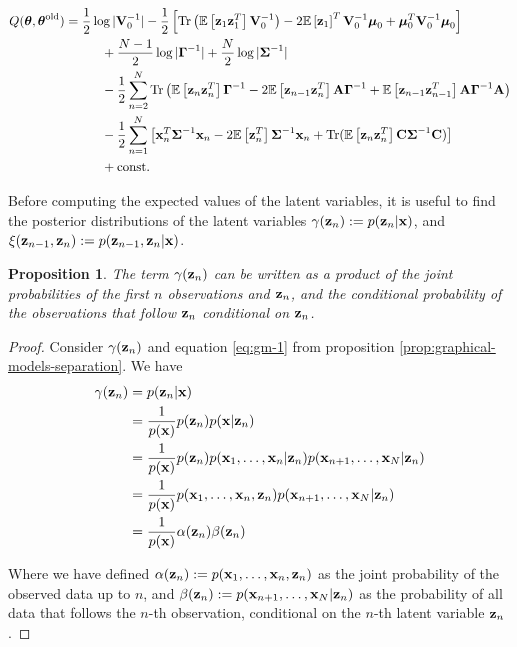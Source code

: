 \documentclass[11pt]{article}
\numberwithin{equation}{section}
\newcommand{\x}{{\bf x}}
\newcommand{\z}{{\bf z}}
\newtheorem{proposition}{Proposition}[section]
\begin{document}
\begin{align}
	Q(\boldsymbol\theta, \boldsymbol\theta^\text{old}) &= \frac{1}{2}\log \vert
	  {\bf V}_0^{-1}\vert -\frac{1}{2}\left[\text{Tr}\left(\mathbb{E}\left[\z_1 \z_1^T\right] {\bf V}_0^{-1}\right) -2 \mathbb{E}\left[\z_1\right]^T{\bf V}_0^{-1}\boldsymbol\mu_0 + \boldsymbol\mu_0^T {\bf V}_0^{-1}\boldsymbol\mu_0\right] \nonumber \\
	  &\hspace{1cm}+ \frac{N-1}{2}\log\vert\boldsymbol\Gamma^{-1}\vert + \frac{N}{2}\log\vert \boldsymbol\Sigma^{-1}\vert \nonumber \\
	  &\hspace{1cm}-\frac{1}{2} \sum_{n=2}^{N}\text{Tr}\left(\mathbb{E}\left[\z_n\z_n^T\right]\boldsymbol\Gamma^{-1} -2\mathbb{E}\left[ \z_{n-1}\z_n^T\right]{\bf A}\boldsymbol\Gamma^{-1} + \mathbb{E}\left[\z_{n-1}\z_{n-1}^T\right]{\bf A}\boldsymbol\Gamma^{-1}{\bf A}\right) \nonumber\\
	  &\hspace{1cm}-\frac{1}{2}\sum_{n=1}^N\left[\x_n^T\boldsymbol{\Sigma}^{-1}\x_n-2\mathbb{E}\left[\z_n^T\right]\boldsymbol\Sigma^{-1}\x_n + \text{Tr}(\mathbb{E}\left[\z_n\z_n^T\right]{\bf C}\boldsymbol\Sigma^{-1}{\bf C})\right] \nonumber\\
	  &\hspace{1cm} + \text{const.} \label{eq:Q-LDS}
\end{align}

Before computing the expected values of the latent variables, it is useful to find the posterior distributions of the latent variables $\gamma(\z_n) := p(\z_n\vert \x)$, and $\xi(\z_{n-1}, \z_{n}) := p(\z_{n-1}, \z_n\vert \x)$. %

\begin{proposition}
	The term $\gamma(\z_n)$ can be written as a product of the joint probabilities of the first $n$ observations and $\z_n$, and the conditional probability of the observations that follow $\z_n$ conditional on $\z_n$.
\end{proposition}

\begin{proof}\label{prop:gamma-factorisation}
Consider  $\gamma(\z_n)$ and equation \eqref{eq:gm-1} from proposition \ref{prop:graphical-models-separation}. We have
\begin{align}
	\gamma(\z_n) &= p(\z_n \vert \x)\\
					  &= \frac{1}{p(\x)}p(\z_n)p(\x \vert \z_n)\\
					  &= \frac{1}{p(\x)} p(\z_n) p(\x_1, \ldots, \x_n\vert \z_n) p(\x_{n+1}, \ldots, \x_N\vert \z_n)\\
					  &= \frac{1}{p(\x)}p(\x_1, \ldots, \x_n, \z_n) p(\x_{n+1}, \ldots, \x_N\vert \z_n)\\
					  &= \frac{1}{p(\x)}\alpha(\z_n)\beta(\z_n)
\end{align}

Where we have defined $\alpha(\z_n) := p(\x_1, \ldots, \x_n, \z_n)$ as the joint probability of the observed data up to $n$, and $\beta(\z_n) := p(\x_{n+1}, \ldots, \x_N\vert \z_n)$ as the probability of all data that follows the $n$-th observation, conditional on the $n$-th latent variable $\z_n$.
\end{proof}
\end{document}
